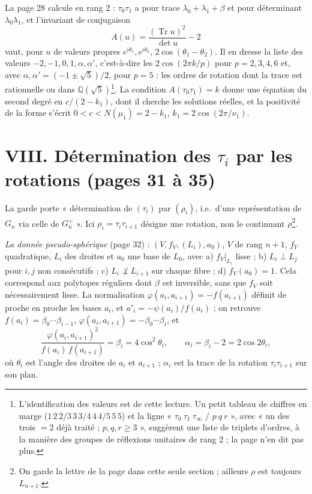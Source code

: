 \documentclass[11pt,a4paper]{article}
\begin{document}
La page 28 calcule en rang $2$ : $\tau_0\tau_1$ a pour trace $\lambda_0 +
\lambda_1 + \beta$ et pour déterminant $\lambda_0\lambda_1$, et l'invariant de
conjugaison
\[
A(u) = \frac{(\operatorname{Tr} u)^2}{\det u} - 2
\]
vaut, pour $u$ de valeurs propres $e^{i\theta_1}, e^{i\theta_2}$, $2\cos(\theta_1 -
\theta_2)$. Il en dresse la liste des valeurs $-2, -1, 0, 1, \alpha, \alpha'$,
c'est-à-dire les $2\cos(2\pi k/p)$ pour $p = 2, 3, 4, 6$ et, avec $\alpha,
\alpha' = (-1 \pm \sqrt 5)/2$, pour $p = 5$ : les ordres de rotation dont la
trace est rationnelle ou dans $\mathbb{Q}(\sqrt 5)$\footnote{L'identification
des valeurs est de cette lecture. Un petit tableau de chiffres en marge ($1\,2\,2
/ 3\,3\,3 / 4\,4\,4 / 5\,5\,5$) et la ligne « $\tau_0\ \tau_1\ \tau_\infty$ /
$p\ q\ r$ », avec « un des trois $= 2$ déjà traité ; $p, q, r \geqslant 3$ »,
suggèrent une liste de triplets d'ordres, à la manière des groupes de
réflexions unitaires de rang $2$ ; la page n'en dit pas plus.}. La condition
$A(\tau_0\tau_1) = k$ donne une équation du second degré en $c/(2 - k_1)$, dont
il cherche les solutions réelles, et la positivité de la forme s'écrit $0 < c <
N(\mu_1) = 2 - k_1$, $k_1 = 2\cos(2\pi/\nu_1)$.

\section*{VIII. Détermination des $\tau_i$ par les rotations (pages 31 à 35)}

La garde porte « détermination de $(\tau_i)$ par $(\rho_i)$, i.e.\ d'une
représentation de $G_n$ via celle de $G_n^+$ ». Ici $\rho_i = \tau_i\tau_{i+1}$
désigne une rotation, non le continuant $\rho$\footnote{On garde la lettre de
la page dans cette seule section ; ailleurs $\rho$ est toujours $L_{n+1}$.}.

\emph{La donnée pseudo-sphérique} (page 32) : $(V, f_V, (L_i), a_0)$, $V$ de rang
$n+1$, $f_V$ quadratique, $L_i$ des droites et $a_0$ une base de $L_0$, avec
a) $f_V|_{L_i}$ lisse ; b) $L_i \perp L_j$ pour $i, j$ non consécutifs ; c)
$L_i \not\perp L_{i+1}$ sur chaque fibre ; d) $f_V(a_0) = 1$. Cela correspond aux
polytopes réguliers dont $\beta$ est inversible, sans que $f_V$ soit
nécessairement lisse. La normalisation $\varphi(a_i, a_{i+1}) = -f(a_{i+1})$
définit de proche en proche les bases $a_i$, et $a'_i = -\psi(a_i)/f(a_i)$ ; on
retrouve $f(a_i) = \beta_0 \cdots \beta_{i-1}$, $\varphi(a_i, a_{i+1}) = -\beta_0
\cdots \beta_i$, et
\[
\frac{\varphi(a_i, a_{i+1})^2}{f(a_i)\, f(a_{i+1})} = \beta_i = 4\cos^2\theta_i,
\qquad \alpha_i = \beta_i - 2 = 2\cos 2\theta_i ,
\]
où $\theta_i$ est l'angle des droites de $a_i$ et $a_{i+1}$ ; $\alpha_i$ est la
trace de la rotation $\tau_i\tau_{i+1}$ sur son plan.
\end{document}
